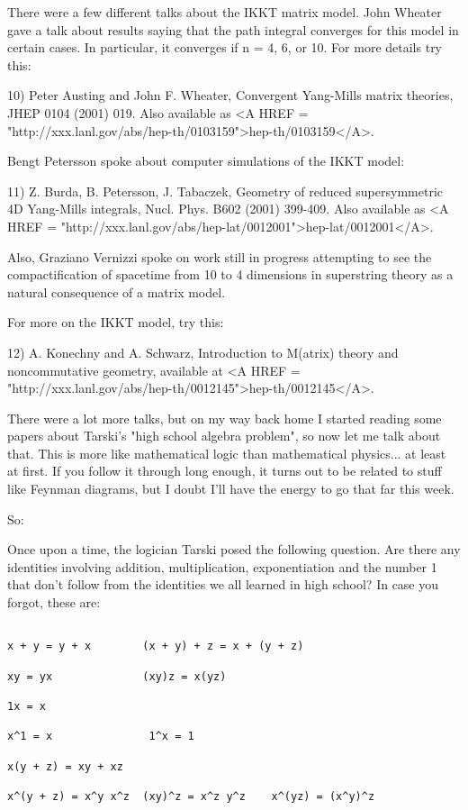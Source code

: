 There were a few different talks about the IKKT matrix model.  John
Wheater gave a talk about results saying that the path integral
converges for this model in certain cases.  In particular, it converges
if n = 4, 6, or 10.  For more details try this:

10) Peter Austing and John F. Wheater, Convergent Yang-Mills matrix
theories, JHEP 0104 (2001) 019.  Also available as <A HREF = "http://xxx.lanl.gov/abs/hep-th/0103159">hep-th/0103159</A>.

Bengt Petersson spoke about computer simulations of the IKKT model:

11) Z. Burda, B. Petersson, J. Tabaczek, Geometry of reduced
supersymmetric 4D Yang-Mills integrals, Nucl. Phys. B602 (2001) 399-409.
Also available as <A HREF = "http://xxx.lanl.gov/abs/hep-lat/0012001">hep-lat/0012001</A>.

Also, Graziano Vernizzi spoke on work still in progress attempting to
see the compactification of spacetime from 10 to 4 dimensions in
superstring theory as a natural consequence of a matrix model.

For more on the IKKT model, try this:

12) A. Konechny and A. Schwarz, Introduction to M(atrix) theory and
noncommutative geometry, available at <A HREF = "http://xxx.lanl.gov/abs/hep-th/0012145">hep-th/0012145</A>.

There were a lot more talks, but on my way back home I started
reading some papers about Tarski's "high school algebra problem",
so now let me talk about that.  This is more like mathematical logic
than mathematical physics... at least at first.  If you follow it
through long enough, it turns out to be related to stuff like Feynman
diagrams, but I doubt I'll have the energy to go that far this week.

So:

Once upon a time, the logician Tarski posed the following question.  Are
there any identities involving addition, multiplication, exponentiation
and the number 1 that don't follow from the identities we all learned in
high school?  In case you forgot, these are:


\begin{verbatim}

x + y = y + x        (x + y) + z = x + (y + z) 

xy = yx              (xy)z = x(yz)

1x = x

x^1 = x               1^x = 1

x(y + z) = xy + xz 

x^(y + z) = x^y x^z  (xy)^z = x^z y^z    x^(yz) = (x^y)^z
\end{verbatim}
    
